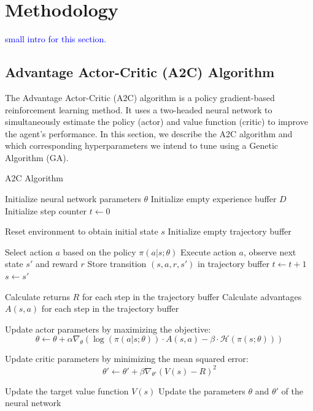 \documentclass{article}
\newcommand{\TODO}[1]{\textcolor{blue}{#1}}
\begin{document}
\section{Methodology}
\label{sec:meth}

\TODO{small intro for this section.}

\subsection{Advantage Actor-Critic (A2C) Algorithm}
\label{ssec:A2C}

The Advantage Actor-Critic (A2C) algorithm is a policy gradient-based reinforcement learning method.
It uses a two-headed neural network to simultaneously estimate the policy (actor) and value function (critic) to improve the agent's performance.
In this section, we describe the A2C algorithm and which corresponding hyperparameters we intend to tune using a Genetic Algorithm (GA).

\begin{algorithm}[H]
  \caption{A2C Algorithm}
  \label{alg:A2C}
  \begin{algorithmic}[1]
    \STATE Initialize neural network parameters $\theta$
    \STATE Initialize empty experience buffer $D$
    \STATE Initialize step counter $t \gets 0$
    
      \STATE Reset environment to obtain initial state $s$
      \STATE Initialize empty trajectory buffer
      
        \STATE Select action $a$ based on the policy $\pi(a|s;\theta)$
        \STATE Execute action $a$, observe next state $s'$ and reward $r$
        \STATE Store transition $(s, a, r, s')$ in trajectory buffer
        \STATE $t \gets t + 1$
        \STATE $s \gets s'$
      \ENDWHILE
      
      \STATE Calculate returns $R$ for each step in the trajectory buffer
      \STATE Calculate advantages $A(s,a)$ for each step in the trajectory buffer
      
      \STATE Update actor parameters by maximizing the objective:
      \[
        \theta \gets \theta + \alpha \nabla_\theta \left( \log(\pi(a|s;\theta)) \cdot A(s,a) - \beta \cdot \mathcal{H}(\pi(s;\theta)) \right)
      \]
      
      \STATE Update critic parameters by minimizing the mean squared error:
      \[
        \theta' \gets \theta' + \beta \nabla_{\theta'} \left( V(s) - R \right)^2
      \]
      
      \STATE Update the target value function $V(s)$
      \STATE Update the parameters $\theta$ and $\theta'$ of the neural network
      
      \ENDWHILE
    \end{algorithmic}
\end{algorithm}
\end{document}
